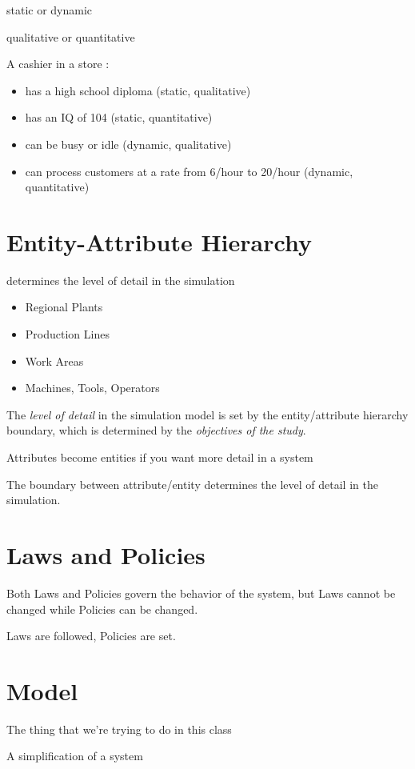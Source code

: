 \documentclass[fleqn]{report}
\begin{document}
static or dynamic

qualitative or quantitative 

A cashier in a store :
\begin{itemize}
    \item 
    has a high school diploma (static, qualitative)
    \item 
    has an IQ of 104 (static, quantitative)
    \item 
    can be busy or idle (dynamic, qualitative)
    \item 
    can process customers at a rate from 6/hour to 20/hour (dynamic, quantitative)
\end{itemize}

\section{Entity-Attribute Hierarchy}
determines the level of detail in the simulation 
\begin{itemize}
    \item 
    Regional Plants 
    \item 
    Production Lines 
    \item 
    Work Areas 
    \item 
    Machines, Tools, Operators 
\end{itemize}

The \textit{level of detail} in the simulation model 
is set by the entity/attribute hierarchy boundary, 
which is determined by the \textit{objectives of the study}. 

Attributes become entities if you want more detail in a system 

The boundary between attribute/entity determines the level of detail 
in the simulation. 

\section{Laws and Policies}
Both Laws and Policies govern the behavior of the system, but Laws cannot 
be changed while Policies can be changed. 

Laws are followed, Policies are set. 

\section{Model}
The thing that we're trying to do in this class 

A simplification of a system 
\end{document}
